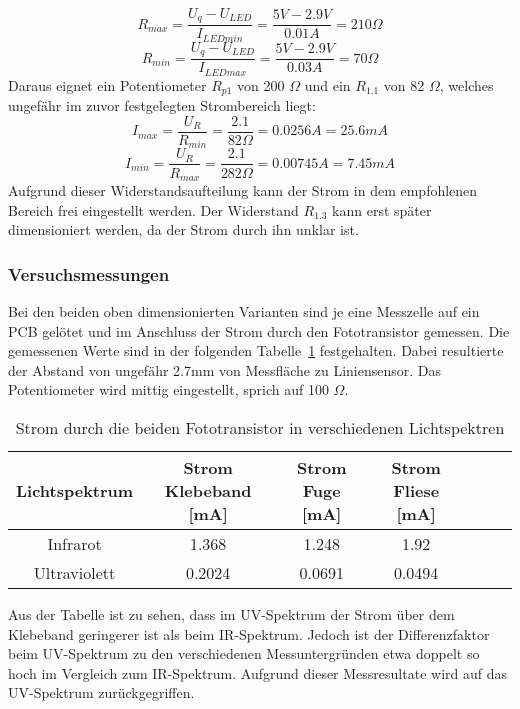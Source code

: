 \documentclass[main.tex]{subfiles} %
\begin{document}
\[
    R_{max} = \frac{U_q - U_{LED}}{I_{LEDmin}} = \frac{5 V - 2.9 V}{0.01A} = 210 \Omega
\]
\[
    R_{min} = \frac{U_q - U_{LED}}{I_{LEDmax}} = \frac{5 V - 2.9 V}{0.03A} = 70 \Omega
\]
Daraus eignet ein Potentiometer $R_{p1}$ von 200 $\Omega$ und ein $R_{1.1}$ von
82 $\Omega$, welches ungefähr im zuvor festgelegten Strombereich liegt:
\[
    I_{max} = \frac{U_R}{R_{min}} = \frac{2.1}{82 \Omega} = 0.0256 A = 25.6 mA
\]
\[
    I_{min} = \frac{U_R}{R_{max}} = \frac{2.1}{282 \Omega} = 0.00745 A = 7.45 mA
\]
Aufgrund dieser Widerstandsaufteilung kann der Strom in dem empfohlenen Bereich
frei eingestellt werden. Der Widerstand $R_{1.3}$ kann erst später
dimensioniert werden, da der Strom durch ihn unklar ist.

\subsubsection*{Versuchsmessungen}
Bei den beiden oben dimensionierten Varianten sind je eine Messzelle auf ein PCB gelötet und im Anschluss der Strom durch den
Fototransistor gemessen. Die gemessenen Werte sind in der folgenden Tabelle~\ref{tab:Strommessungen_einzeln} festgehalten. Dabei resultierte der
Abstand von ungefähr 2.7mm von Messfläche zu Liniensensor. Das Potentiometer wird mittig eingestellt, sprich
auf 100 $\Omega$.

\begin{table}[h]
    \centering
    \begin{tabular}{|c|c|c|c|c|c|c|}
        \hline
        \textbf{Lichtspektrum} & \textbf{Strom Klebeband [mA]} & \textbf{Strom Fuge [mA]} & \textbf{Strom Fliese [mA]} \\ \hline
        Infrarot               & 1.368                         & 1.248                    & 1.92                       \\ \hline
        Ultraviolett           & 0.2024                        & 0.0691                   & 0.0494                     \\ \hline

    \end{tabular}
    \caption{Strom durch die beiden Fototransistor in verschiedenen Lichtspektren}
    \label{tab:Strommessungen_einzeln}
\end{table}

Aus der Tabelle ist zu sehen, dass im UV-Spektrum der Strom über dem Klebeband
geringerer ist als beim IR-Spektrum. Jedoch ist der Differenzfaktor beim
UV-Spektrum zu den verschiedenen Messuntergründen etwa doppelt so hoch im
Vergleich zum IR-Spektrum. Aufgrund dieser Messresultate wird auf das
UV-Spektrum zurückgegriffen.
\end{document}
